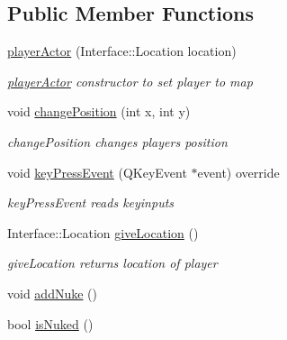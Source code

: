 \subsection*{Public Member Functions}
\begin{DoxyCompactItemize}
\item 
\hyperlink{class_student_side_1_1player_actor_a58a39690b97b3442cd7e01a3fae5b8bb}{player\-Actor} (Interface\-::\-Location location)
\begin{DoxyCompactList}\small\item\em \hyperlink{class_student_side_1_1player_actor}{player\-Actor} constructor to set player to map \end{DoxyCompactList}\item 
void \hyperlink{class_student_side_1_1player_actor_a6f2221903208ea8475f4c27efa76e842}{change\-Position} (int x, int y)
\begin{DoxyCompactList}\small\item\em change\-Position changes players position \end{DoxyCompactList}\item 
void \hyperlink{class_student_side_1_1player_actor_a9feca7b2dd13c5a8febc7c54aac8940e}{key\-Press\-Event} (Q\-Key\-Event $\ast$event) override
\begin{DoxyCompactList}\small\item\em key\-Press\-Event reads keyinputs \end{DoxyCompactList}\item 
Interface\-::\-Location \hyperlink{class_student_side_1_1player_actor_a551fd8c11c43a9ebb0401ed0ee9ef63c}{give\-Location} ()
\begin{DoxyCompactList}\small\item\em give\-Location returns location of player \end{DoxyCompactList}\item 
void \hyperlink{class_student_side_1_1player_actor_a2d1a691ca176eb1436febd320d2040ab}{add\-Nuke} ()
\item 
bool \hyperlink{class_student_side_1_1player_actor_a54888fe10ceb2fdcd7b99e7f5c227da9}{is\-Nuked} ()
\end{DoxyCompactItemize}


